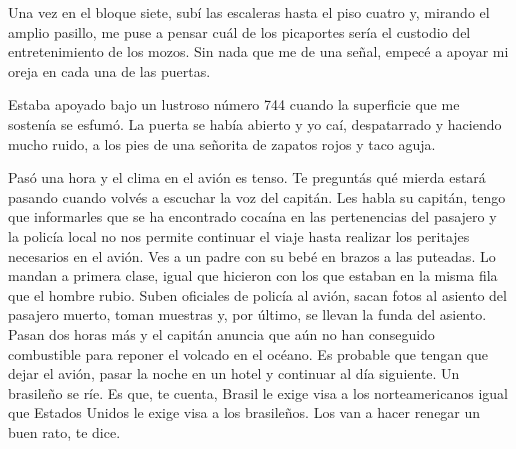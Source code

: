\documentclass[12pt,twoside,openright,a5paper]{book}
\begin{document}
\vspace{0.5cm}
\hrulefill\hspace{0.2cm} \decofourleft\decofourright \hspace{0.2cm} \hrulefill
\vspace{0.5cm}

Una vez en el bloque siete, subí las escaleras hasta el piso cuatro y,
mirando el amplio pasillo, me puse a pensar cuál de los picaportes sería el
custodio del entretenimiento de los mozos. Sin nada que me de una señal,
empecé a apoyar mi oreja en cada una de las puertas.

Estaba apoyado bajo un lustroso número 744 cuando la superficie que me
sostenía se esfumó. La puerta se había abierto y yo caí, despatarrado
y haciendo mucho ruido, a los pies de una señorita de zapatos rojos y
taco aguja.


\vspace{0.5cm}
\hrulefill\hspace{0.2cm} \decofourleft\decofourright \hspace{0.2cm} \hrulefill
\vspace{0.5cm}

Pasó una hora y el clima en el avión es tenso. Te preguntás qué mierda
estará pasando cuando volvés a escuchar la voz del capitán. Les habla
su capitán, tengo que informarles que se ha encontrado cocaína en las
pertenencias del pasajero y la policía local no nos permite continuar el
viaje hasta realizar los peritajes necesarios en el avión. Ves a un padre
con su bebé en brazos a las puteadas. Lo mandan a primera clase, igual que
hicieron con los que estaban en la misma fila que el hombre rubio. Suben
oficiales de policía al avión, sacan fotos al asiento del pasajero muerto,
toman muestras y, por último, se llevan la funda del asiento. Pasan dos
horas más y el capitán anuncia que aún no han conseguido combustible para
reponer el volcado en el océano. Es probable que tengan que dejar el avión,
pasar la noche en un hotel y continuar al día siguiente. Un brasileño se
ríe. Es que, te cuenta, Brasil le exige visa a los norteamericanos igual
que Estados Unidos le exige visa a los brasileños. Los van a hacer renegar
un buen rato, te dice.


\vspace{0.5cm}
\hrulefill\hspace{0.2cm} \decofourleft\decofourright \hspace{0.2cm} \hrulefill
\vspace{0.5cm}
\end{document}
